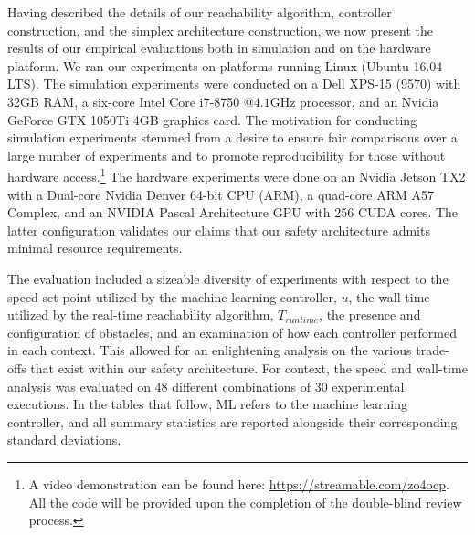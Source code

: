 \documentclass[manuscript,screen,review]{acmart}
\begin{document}



Having described the details of our reachability algorithm, controller construction, and the simplex architecture construction, we now present the results of our empirical evaluations both in simulation and on the hardware platform. We ran our experiments on platforms running Linux (Ubuntu 16.04 LTS). The simulation experiments were conducted on a Dell XPS-15 (9570) with 32GB RAM, a six-core Intel Core i7-8750 $@ 4.1\textrm{GHz}$ processor, and an Nvidia GeForce GTX 1050Ti 4GB graphics card. The motivation for conducting simulation experiments stemmed from a desire to ensure fair comparisons over a large number of experiments and to promote reproducibility for those without hardware access.\footnote{A video demonstration can be found here: \url{https://streamable.com/zo4ocp}. All the code will be provided upon the completion of the double-blind review process.} The hardware experiments were done on an Nvidia Jetson TX2 with a Dual-core Nvidia Denver 64-bit CPU (ARM), a quad-core ARM A57 Complex, and an NVIDIA Pascal Architecture GPU with 256 CUDA cores. The latter configuration validates our claims that our safety architecture admits minimal resource requirements. 


The evaluation included a sizeable diversity of experiments with respect to the speed set-point utilized by the machine learning controller, $u$, the wall-time utilized by the real-time reachability algorithm, $T_{runtime}$, the presence and configuration of obstacles, and an examination of how each controller performed in each context. This allowed for an enlightening analysis on the various trade-offs that exist within our safety architecture. For context, the speed and wall-time analysis was evaluated on 48 different combinations of 30 experimental executions. %
In the tables that follow, ML refers to the machine learning controller, and all summary statistics are reported alongside their corresponding standard deviations. %
\end{document}
